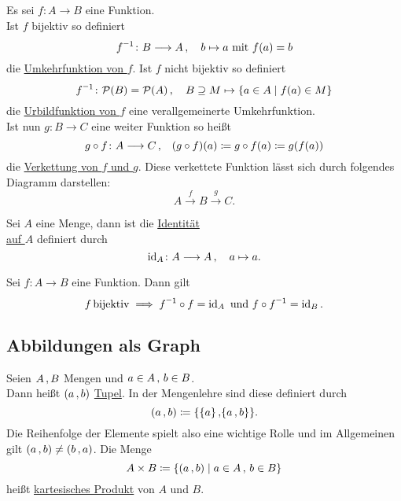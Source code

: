 \documentclass[../ana1.tex]{subfiles}
\begin{document}
\begin{defi*}
	Es sei \(f \colon A \longrightarrow B \) eine Funktion. \\
	Ist \(f \) bijektiv so definiert
	\[\inverse{f} \colon B \longrightarrow A \ko \quad b \mapsto a \text{ mit } f(a) = b \]
	die \underline{Umkehrfunktion von \(f \)}.
	Ist \(f \) nicht bijektiv so definiert
	\[\inverse{f} \colon \PO(B) = \PO(A) \ko \quad B \supseteq M \mapsto \set{a \in A \; \vert \; f(a) \in M} \]
	die \underline{Urbildfunktion von \(f \)} eine verallgemeinerte Umkehrfunktion. \\
	Ist nun \(g \colon B \longrightarrow C \) eine weiter Funktion so heißt
	\[g \circ f \colon A \longrightarrow C \operatorname{,} \quad (g \circ f)(a) \coloneqq g \circ f(a) \coloneqq g(f(a)) \]
	die \underline{Verkettung von \(f \) und \(g \)}. Diese verkettete Funktion lässt sich durch folgendes Diagramm darstellen:
	\[A \overset{f}{\longrightarrow} B \overset{g}{\longrightarrow} C. \]
\end{defi*}

\begin{defi*}[Identitätsabbildung]
	Sei \(A \) eine Menge, dann ist die \underline{Identität} \\
	\underline{auf \(A \)} definiert durch
	\[\operatorname{id}_{A} \colon A \longrightarrow A \operatorname{,} \quad a \mapsto a. \]
\end{defi*}


\begin{bem}
	Sei \(f \colon A \longrightarrow B \) eine Funktion. Dann gilt
	\[f \bijektiv \implies \inverse{f} \circ f = \id_{A} \text{ und } f \circ \inverse{f} = \id_{B}. \]
\end{bem}


\subsection{Abbildungen als Graph}

\begin{defi}
	Seien \(A \operatorname{,} B \) Mengen und \(a \in A \operatorname{,} \, b \in B \). \\
	Dann heißt \((a \operatorname{,} b) \) \underline{Tupel}.
	In der Mengenlehre sind diese definiert durch 
	\[(a \operatorname{,} b) \coloneqq \{\{a\}\operatorname{,} \{a \operatorname{,} b\}\}. \]
	Die Reihenfolge der Elemente spielt also eine wichtige Rolle und im Allgemeinen gilt \((a \operatorname{,} b) \neq (b \operatorname{,} a) \).
	Die Menge
	\[A \times B \coloneqq \{(a \operatorname{,} b) \; \vert \; a \in A \operatorname{,} \, b \in B\} \]
	heißt \underline{kartesisches Produkt} von \(A \) und \(B \).
\end{defi}
\end{document}
